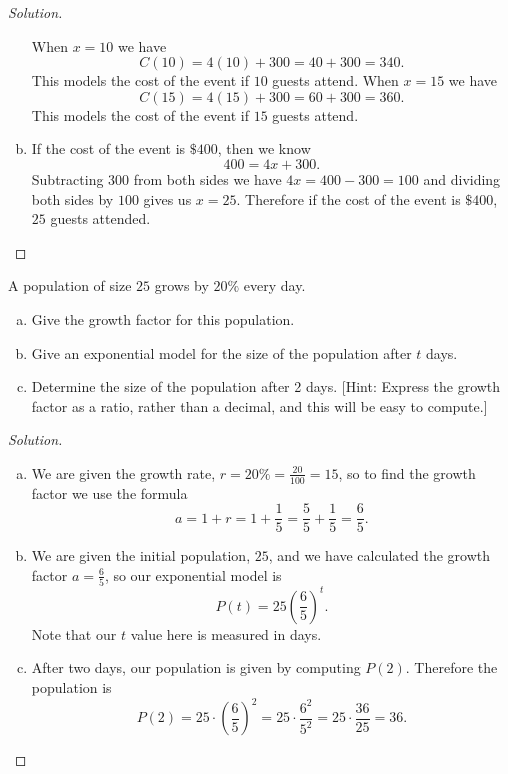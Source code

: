 \documentclass[12pt]{amsart}
\begin{document}
\begin{thm}[16 Points]
\begin{proof}[Solution]
\begin{enumerate}[(a)]
      When $x = 10$ we have
      $$C(10) = 4(10) + 300 = 40 + 300 = 340.$$
      This models the cost of the event if $10$ guests attend.
      When $x = 15$ we have
      $$C(15) = 4(15) + 300 = 60 + 300 = 360.$$
      This models the cost of the event if $15$ guests attend.
    \item
      If the cost of the event is $\$400$, then we know 
      $$400 = 4x + 300.$$
      Subtracting 300 from both sides we have
      $4x = 400 - 300 = 100$
      and dividing both sides by $100$ gives us
      $x = 25$.
      Therefore if the cost of the event is $\$400$, $25$ guests attended.
    \end{enumerate}
  \end{proof}
\end{thm}



\begin{thm}[16 Points]
  A population of size $25$ grows by $20\%$ every day.
  \begin{enumerate}[(a)]
  \item
    Give the growth factor for this population.
  \item
    Give an exponential model for the size of the population after $t$ days.
  \item
    Determine the size of the population after 2 days.  [Hint: Express the growth factor as a ratio, rather than a decimal, and this will be easy to compute.]
  \end{enumerate}
  
  \begin{proof}[Solution]
    \begin{enumerate}[(a)]
    \item
      We are given the growth rate, $r = 20\% = \frac{20}{100} = {1}{5}$, so to find the growth factor we use the formula
      $$a = 1 + r = 1 + \frac{1}{5} = \frac{5}{5} + \frac{1}{5} = \frac{6}{5}.$$
    \item
      We are given the initial population, $25$, and we have calculated the growth factor $a = \frac{6}{5}$, so our exponential model is
      $$P(t) = 25\left(\frac{6}{5}\right)^t.$$
      Note that our $t$ value here is measured in days.
    \item
      After two days, our population is given by computing $P(2)$.
      Therefore the population is
      $$P\left(2\right) = 25 \cdot \left(\frac{6}{5}\right)^2 = 25 \cdot \frac{6^2}{5^2} = 25 \cdot \frac{36}{25} = 36.$$
    \end{enumerate}
  \end{proof}
\end{thm}
\end{document}
